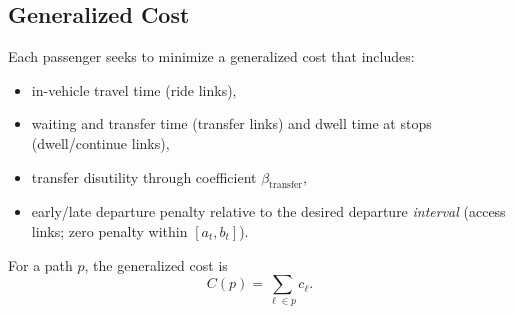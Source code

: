 \subsection{Generalized Cost}

Each passenger seeks to minimize a generalized cost that includes:
\begin{itemize}
\item in-vehicle travel time (ride links),
\item waiting and transfer time (transfer links) and dwell time at stops (dwell/continue links),
\item transfer disutility through coefficient $\beta_{\mathrm{transfer}}$,
\item early/late departure penalty relative to the desired departure \emph{interval} (access links; zero penalty within $[a_t,b_t]$).
\end{itemize}

For a path $p$, the generalized cost is
\[
C(p) = \sum_{\ell \in p} c_\ell.
\]

